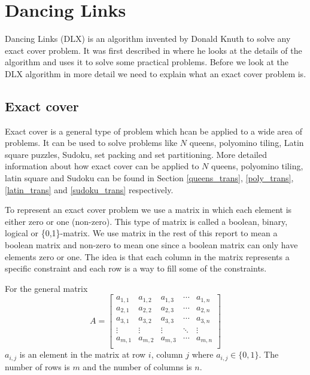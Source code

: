 
\chapter{Dancing Links}
\label{dancing_links}

Dancing Links (DLX) is an algorithm invented by Donald Knuth to solve any exact cover problem.
It was first described in \cite{knuth00dancing} where he looks at the details of the algorithm and uses it to solve some practical problems.
Before we look at the DLX algorithm in more detail we need to explain what an exact cover problem is.



\section{Exact cover}
\label{exact_cover}

Exact cover is a general type of problem which hcan be applied to a wide area of problems.
It can be used to solve problems like $N$ queens, polyomino tiling, Latin square puzzles, Sudoku, set packing and set partitioning.
More detailed information about how exact cover can be applied to $N$ queens, polyomino tiling, latin square and Sudoku can be found in Section \ref{queens_trans}, \ref{poly_trans}, \ref{latin_trans} and \ref{sudoku_trans} respectively.

To represent an exact cover problem we use a matrix in which each element is either zero or one (non-zero).
This type of matrix is called a boolean, binary, logical or \{0,1\}-matrix.
We use matrix in the rest of this report to mean a boolean matrix and non-zero to mean one since a boolean matrix can only have elements zero or one.
The idea is that each column in the matrix represents a specific constraint and each row is a way to fill some of the constraints.

For the general matrix
\begin{equation}
A =
\left[
\begin{array}{ccccc}
	a_{1,1} & a_{1,2} & a_{1,3} & \cdots & a_{1,n} \\
	a_{2,1} & a_{2,2} & a_{2,3} & \cdots & a_{2,n} \\
	a_{3,1} & a_{3,2} & a_{3,3} & \cdots & a_{3,n} \\
	\vdots  & \vdots  & \vdots  & \ddots & \vdots  \\
	a_{m,1} & a_{m,2} & a_{m,3} & \cdots & a_{m,n} \\
\end{array}
\right]
\label{eq:gen_cover_matrix}
\end{equation}
$a_{i,j}$ is an element in the matrix at row $i$, column $j$ where $a_{i,j} \in \{0,1\}$.
The number of rows is $m$ and the number of columns is $n$.

